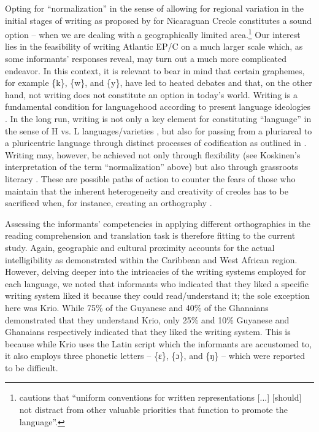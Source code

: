 \documentclass[output=paper,colorlinks,citecolor=brown]{langscibook}
\begin{document}
Opting for “normalization” in the sense of allowing for regional variation in the initial stages of writing as proposed by \citet{Koskinen_2010} for Nicaraguan Creole constitutes a sound option – when we are dealing with a geographically limited area.\footnote{\citet[313]{DeGraff_2014} cautions that “uniform conventions for written representations [...] [should] not distract from other valuable priorities that function to promote the language”.}  Our interest lies in the feasibility of writing Atlantic EP/C on a much larger scale which, as some informants’ responses reveal, may turn out a much more complicated endeavor. In this context, it is relevant to bear in mind that certain graphemes, for example \{k\}, \{w\}, and \{y\}, have led to  heated debates \citep{Bartens_inpreparation} and that, on the other hand, not writing does not constitute an option in today’s world. Writing is a fundamental condition for languagehood according to present language ideologies \citep[e.g.,][]{Lupke_2018}. In the long run, writing is not only a key element for constituting “language” in the sense of H vs. L languages/varieties \citep{Ferraz_1979,Fishman_1967}, but also for passing from a pluriareal to a pluricentric language through distinct processes of codification as outlined in . Writing may, however, be achieved not only through flexibility (see Koskinen’s interpretation of the term “normalization” above) but also through grassroots literacy \citep{Blommaert_2008}. These are possible paths of action to counter the fears of those who maintain that the inherent heterogeneity and creativity of creoles has to be sacrificed when, for instance, creating an orthography \citep[cf.][124]{Freeland_2004}.

Assessing the informants’ competencies in applying different orthographies in the reading comprehension and translation task is therefore fitting to the current study. Again, geographic and cultural proximity accounts for the actual intelligibility as demonstrated within the Caribbean and West African region. However, delving deeper into the intricacies of the writing systems employed for each language, we noted that informants who indicated that they liked a specific writing system liked it because they could read/understand it; the sole exception here was Krio. While 75\% of the Guyanese and 40\% of the Ghanaians demonstrated that they understand Krio, only 25\% and 10\% Guyanese and Ghanaians respectively indicated that they liked the writing system. This is because while Krio uses the Latin script which the informants are accustomed to, it also employs three phonetic letters – \{ɛ\}, \{ɔ\}, and \{ŋ\} – which were reported to be difficult.
\end{document}
